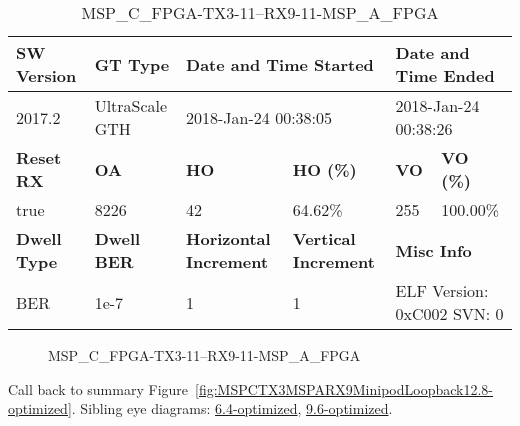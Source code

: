 \begin{table}[h]
\centering
\caption{MSP\_C\_FPGA-TX3-11--RX9-11-MSP\_A\_FPGA}
\label{tab:MSPCFPGATX311RX911MSPAFPGA12.8-optimized}
\begin{tabular}{@{}|l|l|l|l|l|l|@{}}
\toprule
\textbf{SW Version}                & \textbf{GT Type}   & \multicolumn{2}{l|}{\textbf{Date and Time Started}}            & \multicolumn{2}{l|}{\textbf{Date and Time Ended}}        \\ \midrule
2017.2                       & UltraScale GTH          & \multicolumn{2}{l|}{2018-Jan-24 00:38:05}                   & \multicolumn{2}{l|}{2018-Jan-24 00:38:26}               \\ \midrule
\textbf{Reset RX}                  & \textbf{OA} & \textbf{HO}   & \textbf{HO (\%)} & \textbf{VO} & \textbf{VO (\%)} \\ \midrule
true & 8226        & 42          & 64.62\%        & 255        & 100.00\%       \\ \midrule
\textbf{Dwell Type}                & \textbf{Dwell BER} & \textbf{Horizontal Increment} & \textbf{Vertical Increment}    & \multicolumn{2}{l|}{\textbf{Misc Info}}                  \\ \midrule
BER                            & 1e-7        & 1        & 1           & \multicolumn{2}{l|}{ELF Version: 0xC002 SVN: 0}                         \\ \bottomrule
\end{tabular}
\end{table}

\begin{figure}[h]
\caption{MSP\_C\_FPGA-TX3-11--RX9-11-MSP\_A\_FPGA} \label{fig:MSPCFPGATX311RX911MSPAFPGA12.8-optimized}
\end{figure}

Call back to summary Figure~\ref{fig:MSPCTX3MSPARX9MinipodLoopback12.8-optimized}.
Sibling eye diagrams: \hyperref[sec:MSPCFPGATX311RX911MSPAFPGA6.4-optimized]{6.4-optimized}, \hyperref[sec:MSPCFPGATX311RX911MSPAFPGA9.6-optimized]{9.6-optimized}.

\clearpage
\newpage

